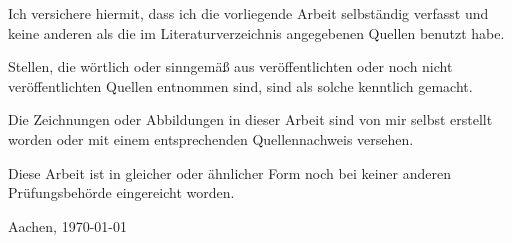 Ich versichere hiermit, dass ich die vorliegende Arbeit selbständig
verfasst und keine anderen als die im Literaturverzeichnis
angegebenen Quellen benutzt habe.\newline

Stellen, die wörtlich oder sinngemäß aus veröffentlichten oder noch
nicht veröffentlichten Quellen entnommen sind, sind als solche
kenntlich gemacht.\newline

Die Zeichnungen oder Abbildungen in dieser Arbeit sind von mir selbst
erstellt worden oder mit einem entsprechenden Quellennachweis
versehen.\newline

Diese Arbeit ist in gleicher oder ähnlicher Form noch bei keiner
anderen Prüfungsbehörde eingereicht worden.
\newline\newline\newline

\par
Aachen, \today